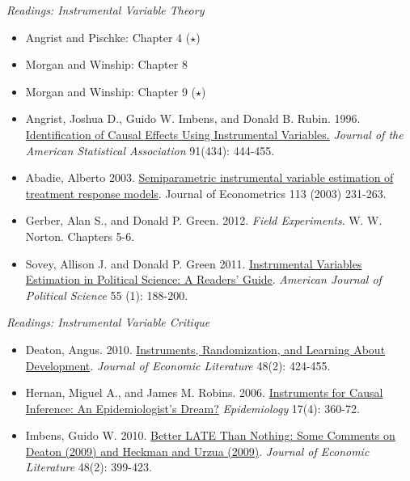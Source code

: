 \documentclass{article}
\begin{document}
\emph{Readings: Instrumental Variable Theory}
\begin{itemize}
\item  Angrist and Pischke: Chapter 4 ($\star$)
\item Morgan and Winship: Chapter 8
\item Morgan and Winship: Chapter 9 ($\star$)
\item Angrist, Joshua D., Guido W. Imbens, and Donald B. Rubin. 1996. \href{http://www.jstor.org/stable/2291629}{Identification of Causal Effects Using Instrumental Variables.} \textit{Journal of the American Statistical Association} 91(434): 444-455.
\item Abadie, Alberto 2003. \href{http://www.hks.harvard.edu/fs/aabadie/gtep.pdf} {Semiparametric instrumental variable estimation of treatment response models}. Journal of Econometrics 113 (2003) 231-263.
\item Gerber, Alan S., and Donald P. Green. 2012. \textit{Field Experiments}. W. W. Norton. Chapters 5-6.
\item Sovey, Allison J. and Donald P. Green 2011. \href{http://faculty.smu.edu/millimet/classes/eco6374/papers/sovey\%20green\%202011.pdf}{Instrumental Variables Estimation in Political Science: A Readers’ Guide}. {\it American Journal of Political Science} 55 (1): 188-200.
\end{itemize}

\emph{Readings: Instrumental Variable Critique}
\begin{itemize}
\item Deaton, Angus. 2010. \href{http://pubs.aeaweb.org/doi/abs/10.1257/jel.48.2.424}{Instruments, Randomization, and Learning About Development}. \textit{Journal of Economic Literature} 48(2): 424-455.
\item Hernan, Miguel A., and James M. Robins. 2006. \href{http://www.jstor.org/stable/20486236?seq=1#page_scan_tab_contents}{Instruments for Causal Inference: An Epidemiologist's Dream?} \textit{Epidemiology} 17(4): 360-72.
\item Imbens, Guido W. 2010. \href{http://www.jstor.org/stable/20778730}{Better LATE Than Nothing: Some Comments on Deaton (2009) and Heckman and Urzua (2009)}. \textit{Journal of Economic Literature} 48(2): 399-423.
\end{itemize}
\end{document}
